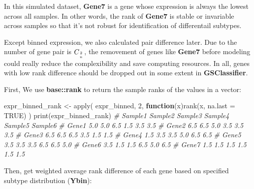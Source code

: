 \documentclass[
  12pt,
]{book}
\newenvironment{Shaded}{\begin{snugshade}}{\end{snugshade}}
\newcommand{\AttributeTok}[1]{\textcolor[rgb]{0.77,0.63,0.00}{#1}}
\newcommand{\CommentTok}[1]{\textcolor[rgb]{0.56,0.35,0.01}{\textit{#1}}}
\newcommand{\ConstantTok}[1]{\textcolor[rgb]{0.00,0.00,0.00}{#1}}
\newcommand{\ControlFlowTok}[1]{\textcolor[rgb]{0.13,0.29,0.53}{\textbf{#1}}}
\newcommand{\DecValTok}[1]{\textcolor[rgb]{0.00,0.00,0.81}{#1}}
\newcommand{\FunctionTok}[1]{\textcolor[rgb]{0.00,0.00,0.00}{#1}}
\newcommand{\NormalTok}[1]{#1}
\newcommand{\OtherTok}[1]{\textcolor[rgb]{0.56,0.35,0.01}{#1}}
\begin{document}
In this simulated dataset, \textbf{Gene7} is a gene whose expression is always the lowest across all samples. In other words, the rank of \textbf{Gene7} is stable or invariable across samples so that it's not robust for identification of differentail subtypes.

Except binned expression, we also calculated pair difference later. Due to the number of gene pair is \(C_{2 \atop n}\), the removement of genes like \textbf{Gene7} before modeling could really reduce the complexibility and save computing resources. In all, genes with low rank difference should be dropped out in some extent in \textbf{GSClassifier}.

First, We use \textbf{base::rank} to return the sample ranks of the values in a vector:

\begin{Shaded}
\begin{Highlighting}[]
\NormalTok{expr\_binned\_rank }\OtherTok{\textless{}{-}} \FunctionTok{apply}\NormalTok{(}
\NormalTok{  expr\_binned, }\DecValTok{2}\NormalTok{, }
  \ControlFlowTok{function}\NormalTok{(x)}\FunctionTok{rank}\NormalTok{(x, }\AttributeTok{na.last =} \ConstantTok{TRUE}\NormalTok{)}
\NormalTok{)}
\FunctionTok{print}\NormalTok{(expr\_binned\_rank)}
\CommentTok{\#       Sample1 Sample2 Sample3 Sample4 Sample5 Sample6}
\CommentTok{\# Gene1     5.0     5.0     6.5     1.5     3.5     3.5}
\CommentTok{\# Gene2     6.5     6.5     5.0     3.5     3.5     3.5}
\CommentTok{\# Gene3     6.5     6.5     6.5     3.5     1.5     1.5}
\CommentTok{\# Gene4     1.5     3.5     3.5     5.0     6.5     6.5}
\CommentTok{\# Gene5     3.5     3.5     3.5     6.5     6.5     5.0}
\CommentTok{\# Gene6     3.5     1.5     1.5     6.5     5.0     6.5}
\CommentTok{\# Gene7     1.5     1.5     1.5     1.5     1.5     1.5}
\end{Highlighting}
\end{Shaded}

Then, get weighted average rank difference of each gene based on specified subtype distribution (\textbf{Ybin}):
\end{document}
